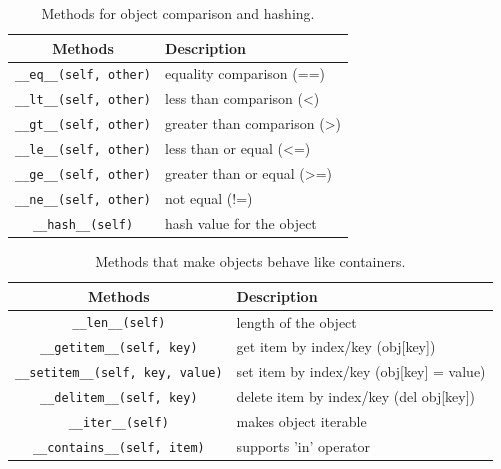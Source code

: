   \begin{definition}
    \label{def:comparison-and-hashing}
    \begin{table}[H]
      \centering
      \begin{tabular}{|c|p{8cm}|}
        \hline
        \textbf{Methods} & \textbf{Description} \\
        \hline 
        \texttt{\_\_eq\_\_(self, other)} & equality comparison (==) \\
        \hline
        \texttt{\_\_lt\_\_(self, other)} & less than comparison (<) \\
        \hline
        \texttt{\_\_gt\_\_(self, other)} & greater than comparison (>) \\
        \hline
        \texttt{\_\_le\_\_(self, other)} & less than or equal (<=) \\
        \hline
        \texttt{\_\_ge\_\_(self, other)} & greater than or equal (>=) \\
        \hline
        \texttt{\_\_ne\_\_(self, other)} & not equal (!=) \\
        \hline
        \texttt{\_\_hash\_\_(self)} & hash value for the object \\
        \hline
      \end{tabular}
      \caption{Methods for object comparison and hashing.}
      \label{tab:comparison_hashing}
    \end{table}
  \end{definition}

  \begin{definition}
    \label{def:container-like-behavior}
    \begin{table}[H]
      \centering
      \begin{tabular}{|c|p{8cm}|}
        \hline
        \textbf{Methods} & \textbf{Description} \\
        \hline 
        \texttt{\_\_len\_\_(self)} & length of the object \\
        \hline
        \texttt{\_\_getitem\_\_(self, key)} & get item by index/key (obj[key]) \\
        \hline
        \texttt{\_\_setitem\_\_(self, key, value)} & set item by index/key (obj[key] = value) \\
        \hline
        \texttt{\_\_delitem\_\_(self, key)} & delete item by index/key (del obj[key]) \\
        \hline
        \texttt{\_\_iter\_\_(self)} & makes object iterable \\
        \hline
        \texttt{\_\_contains\_\_(self, item)} & supports 'in' operator \\
        \hline
      \end{tabular}
      \caption{Methods that make objects behave like containers.}
      \label{tab:container_behavior}
    \end{table}
  \end{definition}

